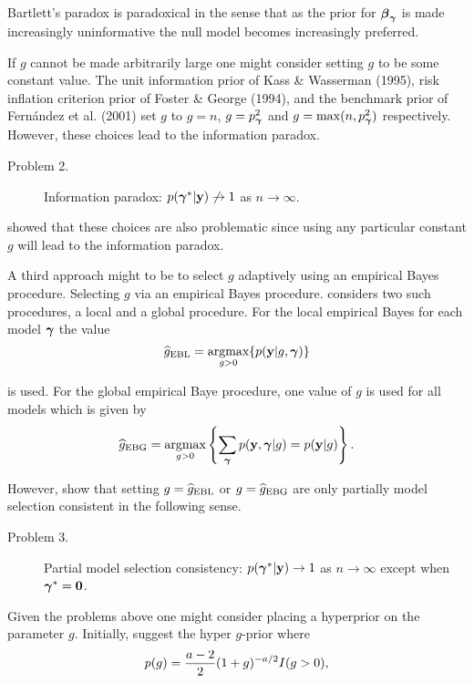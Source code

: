 \documentclass{article}[12pt]
\begin{document}
\noindent Bartlett's paradox is paradoxical in the sense that as the prior for ${\boldsymbol \beta}_{\boldsymbol \gamma}$
is made increasingly uninformative the null model becomes increasingly preferred.

If $g$ cannot be made arbitrarily large one might consider setting $g$ to be some constant
value. The unit information prior of Kass \& Wasserman (1995), risk inflation criterion prior of 
Foster \& George (1994), and the benchmark prior of Fern\'andez et al. (2001) set $g$ to $g=n$, 
$g=p_{\boldsymbol \gamma}^2$ and $g = \max(n,p_{\boldsymbol \gamma}^2)$ respectively. 
However, these choices lead to the information paradox. 
\begin{description}
	\item[Problem 2.] Information paradox: $p({\boldsymbol \gamma}^*|{\bf y}) \not\to 1$ as $n\to\infty$.
\end{description}

\noindent  
\cite{Liang2008} showed that these choices
are also problematic since using any particular constant $g$ will lead to the information paradox.

A third approach might to be to select $g$ adaptively using an empirical Bayes procedure.
Selecting $g$ via an empirical Bayes procedure. 
\cite{Liang2008} considers two such procedures, a local and a global procedure.
For the local empirical Bayes for each model ${\boldsymbol \gamma}$
the value 
$$
\ds \widehat{g}_{\mbox{\scriptsize EBL}} = \argmax_{g>0} \{ p(\vy|g,\vgamma) \}
$$ 

\noindent 
is used. For the 
global empirical Baye procedure, one value of $g$ is used for all models which is 
given by
$$
\ds \widehat{g}_{\mbox{\scriptsize EBG}} = \argmax_{g>0} \left\{ \sum_{\vgamma}  p(\vy,\vgamma|g) = p(\vy|g) \right\}.
$$

\noindent 
However, \cite{Liang2008} show that setting
$g = \widehat{g}_{\mbox{\scriptsize EBL}}$ or 
$g = \widehat{g}_{\mbox{\scriptsize EBG}}$
are only partially model selection consistent in the following sense.
\begin{description}
	\item[Problem 3.] Partial model selection consistency: $p({\boldsymbol \gamma}^*|{\bf y}) \to 1$ as $n\to\infty$ except
	when ${\boldsymbol \gamma}^* = {\bf 0}$.
\end{description}

Given the problems above one might consider placing a hyperprior on the parameter $g$. 
Initially, \cite{Liang2008} suggest the hyper $g$-prior where
\begin{equation}\label{eq:hyperG}
\displaystyle p(g) = \frac{a - 2}{2}(1 + g)^{-a/2}I(g>0),
\end{equation}
\end{document}
